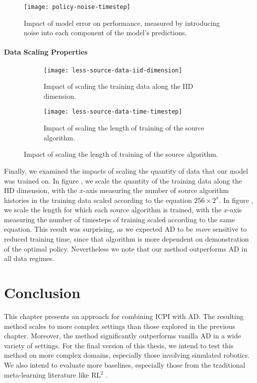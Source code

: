 \begin{figure}
    \centering
    \texttt{[image: policy-noise-timestep]}
    \caption{Impact of model error on performance, measured by introducing noise
        into each component of the model's predictions.}
\end{figure}

\paragraph{Data Scaling Properties}
\begin{figure}[b]
    \centering
    \begin{subfigure}{0.48\textwidth}
        \texttt{[image: less-source-data-iid-dimension]}
        \caption{Impact of scaling the training data along the IID dimension.}
    \end{subfigure}
    \hfill
    \begin{subfigure}{0.48\textwidth}
        \texttt{[image: less-source-data-time-timestep]}
        \caption{Impact of scaling the length of training of the source algorithm.}
    \end{subfigure}
\end{figure}
Finally, we examined the impacts of scaling the quantity of data that our model
was trained on. In figure , we scale the quantity
of the training data along the IID dimension, with the $x$-axis measuring the
number of source algorithm histories in the training data scaled according to
the equation $256 \times 2^x$. In figure , we
scale the length for which each source algorithm is trained, with the $x$-axis
measuring the number of timesteps of training scaled according to the same
equation. This result was surprising, as we expected AD to be \emph{more}
sensitive to reduced training time, since that algorithm is more dependent on
demonstration of the optimal policy. Nevertheless we note that our method
outperforms AD in all data regimes.

\section{Conclusion}
This chapter presents an approach for combining ICPI with AD. The resulting
method scales to more complex settings than those explored in the previous
chapter. Moreover, the method significantly outperforms vanilla AD in a wide
variety of settings. For the final version of this thesis, we intend to test
this method on more complex domains, especially those involving simulated
robotics. We also intend to evaluate more baselines, especially those from the
traditional meta-learning literature like RL$^2$ \parencite{duan_rl2_2016}.
